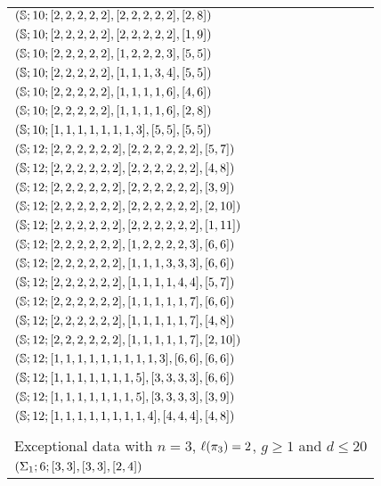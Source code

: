\begin{tabularx}{\mytablewidth}{l}
$(\mathbb{S};10;[2, 2, 2, 2, 2],[2, 2, 2, 2, 2],[2, 8])$\\
$(\mathbb{S};10;[2, 2, 2, 2, 2],[2, 2, 2, 2, 2],[1, 9])$\\
$(\mathbb{S};10;[2, 2, 2, 2, 2],[1, 2, 2, 2, 3],[5, 5])$\\
$(\mathbb{S};10;[2, 2, 2, 2, 2],[1, 1, 1, 3, 4],[5, 5])$\\
$(\mathbb{S};10;[2, 2, 2, 2, 2],[1, 1, 1, 1, 6],[4, 6])$\\
$(\mathbb{S};10;[2, 2, 2, 2, 2],[1, 1, 1, 1, 6],[2, 8])$\\
$(\mathbb{S};10;[1, 1, 1, 1, 1, 1, 1, 3],[5, 5],[5, 5])$\\
$(\mathbb{S};12;[2, 2, 2, 2, 2, 2],[2, 2, 2, 2, 2, 2],[5, 7])$\\
$(\mathbb{S};12;[2, 2, 2, 2, 2, 2],[2, 2, 2, 2, 2, 2],[4, 8])$\\
$(\mathbb{S};12;[2, 2, 2, 2, 2, 2],[2, 2, 2, 2, 2, 2],[3, 9])$\\
$(\mathbb{S};12;[2, 2, 2, 2, 2, 2],[2, 2, 2, 2, 2, 2],[2, 10])$\\
$(\mathbb{S};12;[2, 2, 2, 2, 2, 2],[2, 2, 2, 2, 2, 2],[1, 11])$\\
$(\mathbb{S};12;[2, 2, 2, 2, 2, 2],[1, 2, 2, 2, 2, 3],[6, 6])$\\
$(\mathbb{S};12;[2, 2, 2, 2, 2, 2],[1, 1, 1, 3, 3, 3],[6, 6])$\\
$(\mathbb{S};12;[2, 2, 2, 2, 2, 2],[1, 1, 1, 1, 4, 4],[5, 7])$\\
$(\mathbb{S};12;[2, 2, 2, 2, 2, 2],[1, 1, 1, 1, 1, 7],[6, 6])$\\
$(\mathbb{S};12;[2, 2, 2, 2, 2, 2],[1, 1, 1, 1, 1, 7],[4, 8])$\\
$(\mathbb{S};12;[2, 2, 2, 2, 2, 2],[1, 1, 1, 1, 1, 7],[2, 10])$\\
$(\mathbb{S};12;[1, 1, 1, 1, 1, 1, 1, 1, 1, 3],[6, 6],[6, 6])$\\
$(\mathbb{S};12;[1, 1, 1, 1, 1, 1, 1, 5],[3, 3, 3, 3],[6, 6])$\\
$(\mathbb{S};12;[1, 1, 1, 1, 1, 1, 1, 5],[3, 3, 3, 3],[3, 9])$\\
$(\mathbb{S};12;[1, 1, 1, 1, 1, 1, 1, 1, 4],[4, 4, 4],[4, 8])$\\
\bottomrule\\[1em]
\toprule
\multicolumn{1}{l}{Exceptional data with $n=3$, $\ell(\pi_3)=2$, $g\ge 1$ and $d\le 20$}\\
\midrule
$(\Sigma_{1};6;[3, 3],[3, 3],[2, 4])$\\

\end{tabularx}
